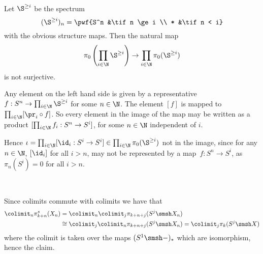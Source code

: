 

\mmaketitle

\begin{exercise}[1]\ 

Let $\S^{\ge i}$ be the spectrum 
\[ (\S^{\ge i})_n = \pwf{S^n &\tif n \ge i \\ * &\tif n < i} \]
with the obvious structure maps. 
Then the natural map 
\[ \pi_0\left( \prod_{i\in\N} \S^{\ge i} \right) \to 
    \prod_{i\in\N} \pi_0(\S^{\ge i}) \]
is not surjective.

Any element on the left hand side is given by a representative 
$f : S^n \to \prod_{i\in\N} \S^{\ge i}$ for some $n \in \N$.
The element $[f]$ is mapped to $\prod_{i\in\N} [\pr_i \circ f]$. So every
element in the image of the map may be written as a product $[\prod_{i\in\N}
f_i : S^n \to S^i]$, for some $n\in \N$ independent of $i$.

Hence $\iota = \prod_{i\in\N} [\id_i : S^i \to S^i] \in \prod_{i\in\N}
\pi_0(\S^{\ge i})$ not in the image, since for any $n\in \N$, $[\id_i]$ for
all $i > n$, may not be represented by a map $f : S^n \to S^i$, as $\pi_n(S^i)
= 0$ for all $i > n$.
\end{exercise}

\begin{exercise}[2]\ 

Since colimits commute with colimits we have that
\begin{align*}
    \colimit_n\pi_{k+n}^s(X_n)&=\colimit_n\colimit_j\pi_{k+n+j}(S^j\smsh X_n)\\
    &\cong\colimit_j\colimit_n\pi_{k+n+j}(S^j\smsh X_n)=\colimit_j\pi_k(S^j\smsh X)
\end{align*}
where the colimit is taken over the maps $(S^1\smsh-)_*$ which are isomorphism, hence the claim.
\end{exercise}

